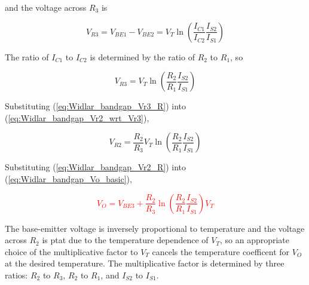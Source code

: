 and the voltage across $R_3$ is

\begin{equation}
V_{R3} = V_{BE1} - V_{BE2} = V_{T}\ln\left(\frac{I_{C1}}{I_{C2}}\frac{I_{S2}}{I_{S1}}\right)
\end{equation}

The ratio of $I_{C1}$ to $I_{C2}$ is determined by the ratio of $R_2$ to $R_1$, so %

\begin{equation}
V_{R3} = V_{T}\ln\left(\frac{R_2}{R_1}\frac{I_{S2}}{I_{S1}}\right)
\label{eq:Widlar_bandgap_Vr3_R}
\end{equation}

Substituting (\ref{eq:Widlar_bandgap_Vr3_R}) into (\ref{eq:Widlar_bandgap_Vr2_wrt_Vr3}),

\begin{equation}
V_{R2} = \frac{R_2}{R_3}V_{T}\ln\left(\frac{R_2}{R_1}\frac{I_{S2}}{I_{S1}}\right)
\label{eq:Widlar_bandgap_Vr2_R}
\end{equation}

Substituting (\ref{eq:Widlar_bandgap_Vr2_R}) into (\ref{eq:Widlar_bandgap_Vo_basic}),

\textcolor{red}{
\begin{equation}
V_{O} = V_{BE3} + \frac{R_2}{R_3}\ln\left(\frac{R_2}{R_1}\frac{I_{S2}}{I_{S1}}\right)V_{T}
\end{equation}
}

The base-emitter voltage is inversely proportional to temperature and the voltage across $R_2$ is \ac{ptat} due to the temperature dependence of $V_{T}$, so an appropriate choice of the multiplicative factor to $V_{T}$ cancels the temperature coefficent for $V_{O}$ at the desired temperature. The multiplicative factor is determined by three ratios: $R_2$ to $R_3$, $R_2$ to $R_1$, and $I_{S2}$ to $I_{S1}$. \autocite[322-323]{analysis-design-analog-ics}



